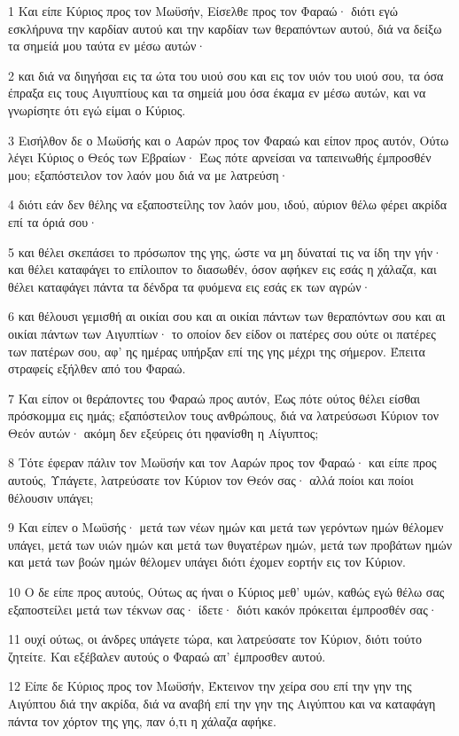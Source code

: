 \par 1 Και είπε Κύριος προς τον Μωϋσήν, Είσελθε προς τον Φαραώ· διότι εγώ εσκλήρυνα την καρδίαν αυτού και την καρδίαν των θεραπόντων αυτού, διά να δείξω τα σημείά μου ταύτα εν μέσω αυτών·
\par 2 και διά να διηγήσαι εις τα ώτα του υιού σου και εις τον υιόν του υιού σου, τα όσα έπραξα εις τους Αιγυπτίους και τα σημείά μου όσα έκαμα εν μέσω αυτών, και να γνωρίσητε ότι εγώ είμαι ο Κύριος.
\par 3 Εισήλθον δε ο Μωϋσής και ο Ααρών προς τον Φαραώ και είπον προς αυτόν, Ούτω λέγει Κύριος ο Θεός των Εβραίων· Έως πότε αρνείσαι να ταπεινωθής έμπροσθέν μου; εξαπόστειλον τον λαόν μου διά να με λατρεύση·
\par 4 διότι εάν δεν θέλης να εξαποστείλης τον λαόν μου, ιδού, αύριον θέλω φέρει ακρίδα επί τα όριά σου·
\par 5 και θέλει σκεπάσει το πρόσωπον της γης, ώστε να μη δύναταί τις να ίδη την γήν· και θέλει καταφάγει το επίλοιπον το διασωθέν, όσον αφήκεν εις εσάς η χάλαζα, και θέλει καταφάγει πάντα τα δένδρα τα φυόμενα εις εσάς εκ των αγρών·
\par 6 και θέλουσι γεμισθή αι οικίαι σου και αι οικίαι πάντων των θεραπόντων σου και αι οικίαι πάντων των Αιγυπτίων· το οποίον δεν είδον οι πατέρες σου ούτε οι πατέρες των πατέρων σου, αφ' ης ημέρας υπήρξαν επί της γης μέχρι της σήμερον. Έπειτα στραφείς εξήλθεν από του Φαραώ.
\par 7 Και είπον οι θεράποντες του Φαραώ προς αυτόν, Έως πότε ούτος θέλει είσθαι πρόσκομμα εις ημάς; εξαπόστειλον τους ανθρώπους, διά να λατρεύσωσι Κύριον τον Θεόν αυτών· ακόμη δεν εξεύρεις ότι ηφανίσθη η Αίγυπτος;
\par 8 Τότε έφεραν πάλιν τον Μωϋσήν και τον Ααρών προς τον Φαραώ· και είπε προς αυτούς, Υπάγετε, λατρεύσατε τον Κύριον τον Θεόν σας· αλλά ποίοι και ποίοι θέλουσιν υπάγει;
\par 9 Και είπεν ο Μωϋσής· μετά των νέων ημών και μετά των γερόντων ημών θέλομεν υπάγει, μετά των υιών ημών και μετά των θυγατέρων ημών, μετά των προβάτων ημών και μετά των βοών ημών θέλομεν υπάγει διότι έχομεν εορτήν εις τον Κύριον.
\par 10 Ο δε είπε προς αυτούς, Ούτως ας ήναι ο Κύριος μεθ' υμών, καθώς εγώ θέλω σας εξαποστείλει μετά των τέκνων σας· ίδετε· διότι κακόν πρόκειται έμπροσθέν σας·
\par 11 ουχί ούτως, οι άνδρες υπάγετε τώρα, και λατρεύσατε τον Κύριον, διότι τούτο ζητείτε. Και εξέβαλεν αυτούς ο Φαραώ απ' έμπροσθεν αυτού.
\par 12 Είπε δε Κύριος προς τον Μωϋσήν, Έκτεινον την χείρα σου επί την γην της Αιγύπτου διά την ακρίδα, διά να αναβή επί την γην της Αιγύπτου και να καταφάγη πάντα τον χόρτον της γης, παν ό,τι η χάλαζα αφήκε.
